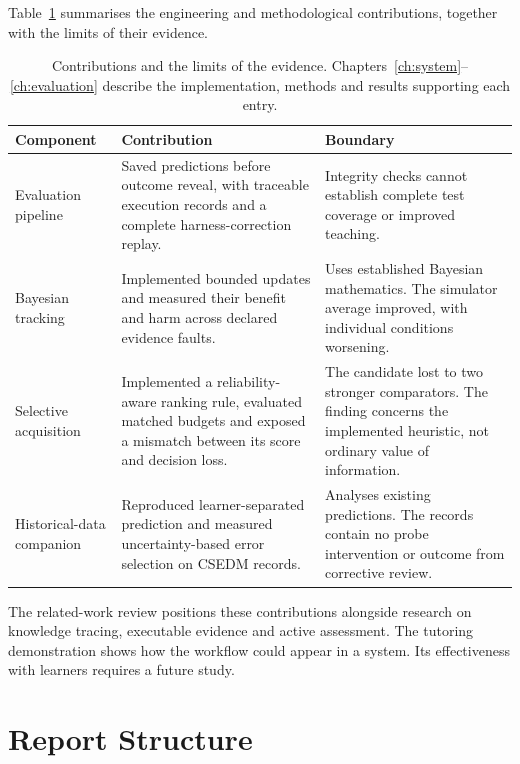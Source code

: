 Table~\ref{tab:contributions} summarises the engineering and methodological contributions, together with the limits of their
evidence.

\begin{table}[htbp]
  \centering
  \caption{Contributions and the limits of the evidence. Chapters~\ref{ch:system}--\ref{ch:evaluation} describe the implementation,
  methods and results supporting each entry.}
  \label{tab:contributions}
  \begin{tabularx}{\textwidth}{@{}>{\raggedright\arraybackslash}p{}>{\raggedright\arraybackslash}X>{\raggedright\arraybackslash}X@{}}
    \toprule
    Component & Contribution & Boundary \\
    \midrule
    Evaluation pipeline & Saved predictions before outcome reveal, with traceable execution records and a complete harness-correction replay.
      & Integrity checks cannot establish complete test coverage or improved teaching. \\
    \addlinespace
    Bayesian tracking & Implemented bounded updates and measured their benefit and harm across declared evidence faults.
      & Uses established Bayesian mathematics. The simulator average improved, with individual conditions worsening. \\
    \addlinespace
    Selective acquisition & Implemented a reliability-aware ranking rule, evaluated matched budgets and exposed a mismatch between its score and decision loss.
      & The candidate lost to two stronger comparators. The finding concerns the implemented heuristic, not ordinary value of information. \\
    \addlinespace
    Historical-data companion & Reproduced learner-separated prediction and measured uncertainty-based error selection on CSEDM records.
      & Analyses existing predictions. The records contain no probe intervention or outcome from corrective review. \\
    \bottomrule
  \end{tabularx}
\end{table}

The related-work review positions these contributions alongside research on knowledge tracing, executable evidence and active
assessment. The tutoring demonstration shows how the workflow could appear in a system. Its effectiveness with learners
requires a future study.

\section{Report Structure}

